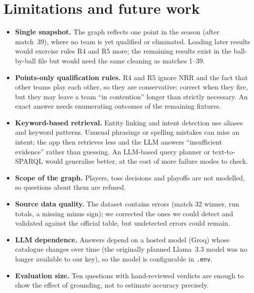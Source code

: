 \section{Limitations and future work}
\begin{itemize}
  \item \textbf{Single snapshot.} The graph reflects one point in the season (after match~39), where no team is
        yet qualified or eliminated. Loading later results would exercise rules R4 and R5 more; the remaining
        results exist in the ball-by-ball file but would need the same cleaning as matches 1--39.
  \item \textbf{Points-only qualification rules.} R4 and R5 ignore NRR and the fact that other teams play each
        other, so they are conservative: correct when they fire, but they may leave a team ``in contention''
        longer than strictly necessary. An exact answer needs enumerating outcomes of the remaining fixtures.
  \item \textbf{Keyword-based retrieval.} Entity linking and intent detection use aliases and keyword patterns.
        Unusual phrasings or spelling mistakes can miss an intent; the app then retrieves less and the LLM
        answers ``insufficient evidence'' rather than guessing. An LLM-based query planner or text-to-SPARQL
        would generalise better, at the cost of more failure modes to check.
  \item \textbf{Scope of the graph.} Players, toss decisions and playoffs are not modelled, so questions about
        them are refused.
  \item \textbf{Source data quality.} The dataset contains errors (match 32 winner, run totals, a missing minus
        sign); we corrected the ones we could detect and validated against the official table, but undetected
        errors could remain.
  \item \textbf{LLM dependence.} Answers depend on a hosted model (Groq) whose catalogue changes over time (the
        originally planned Llama~3.3 model was no longer available to our key), so the model is configurable in
        \texttt{.env}.
  \item \textbf{Evaluation size.} Ten questions with hand-reviewed verdicts are enough to show the effect of
        grounding, not to estimate accuracy precisely.
\end{itemize}
